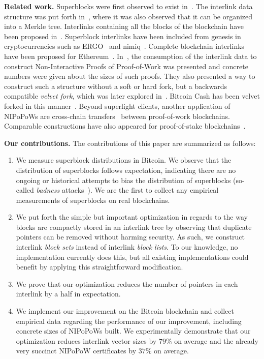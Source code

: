 \noindent
\textbf{Related work.}
Superblocks were first observed to exist in~\cite{highway}.  The interlink data
structure was put forth in~\cite{popow}, where it was also observed that it can
be organized into a Merkle tree. Interlinks containing all the blocks of the
blockchain have been proposed in~\cite{flyclient}. Superblock interlinks have
been included from genesis in cryptocurrencies such as ERGO~\cite{ergo} and
nimiq~\cite{nimiq}.  Complete blockchain interlinks have been proposed for
Ethereum~\cite{eip210}.  In~\cite{nipopows}, the consumption of the interlink
data to construct Non-Interactive Proofs of Proof-of-Work was presented and
concrete numbers were given about the sizes of such proofs. They also presented
a way to construct such a structure without a soft or hard fork, but a
backwards compatible \emph{velvet fork}, which was later explored
in~\cite{velvet}.  Bitcoin Cash has been velvet forked in this
manner~\cite{gtklocker}. Beyond superlight clients, another application of
NIPoPoWs are cross-chain transfers~\cite{pow-sidechains} between proof-of-work
blockchains. Comparable constructions have also appeared for proof-of-stake
blockchains~\cite{pos-sidechains}.

\noindent
\textbf{Our contributions.} The contributions of this paper are summarized as
follows:

\begin{enumerate}
  \item We measure superblock distributions in Bitcoin. We observe that the
        distribution of superblocks follows expectation, indicating there are no
        ongoing or historical attempts to bias the distribution of superblocks
        (so-called \emph{badness} attacks~\cite{nipopows}). We are the first to
        collect any empirical measurements of superblocks on real blockchains.
  \item We put forth the simple but important optimization in regards to the way
        blocks are compactly stored in an interlink tree by observing that
        duplicate pointers can be removed without harming security. As such, we
        construct interlink \emph{block sets} instead of interlink \emph{block
        lists}. To our knowledge, no implementation currently does this, but all
        existing implementations could benefit by applying this straightforward
        modification.
  \item We prove that our optimization reduces the number of pointers in each
        interlink by a half in expectation.
  \item We implement our improvement on the Bitcoin blockchain and collect
        empirical data regarding the performance of our improvement, including
        concrete sizes of NIPoPoWs built. We experimentally demonstrate that our
        optimization reduces interlink vector sizes by $79\%$ on average and
        the already very succinct NIPoPoW certificates by $37\%$ on average.
\end{enumerate}

